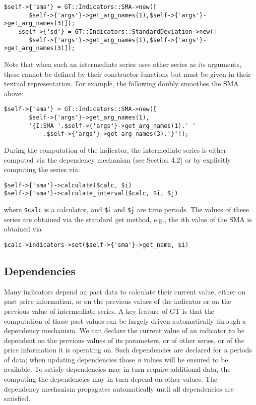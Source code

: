 \documentclass[11pt,twoside]{article}
\begin{document}
\begin{lstlisting}[name=example]
    $self->{'sma'} = GT::Indicators::SMA->new([
       $self->{'args'}->get_arg_names(1),$self->{'args'}->get_arg_names(3)]);
    $self->{'sd'} = GT::Indicators::StandardDeviation->new([
       $self->{'args'}->get_arg_names(1),$self->{'args'}->get_arg_names(3)]);
\end{lstlisting}
Note that when such an intermediate series uses other series as its arguments,
these cannot be defined by their constructor functions but must be given
in their textual representation. For example, the following doubly smoothes
the SMA above:
\begin{lstlisting}[numbers=none]
    $self->{'sma'} = GT::Indicators::SMA->new([
       $self->{'args'}->get_arg_names(1), 
       '{I:SMA '.$self->{'args'}->get_arg_names(1).' '
           .$self->{'args'}->get_arg_names(3).'}']);
\end{lstlisting}


During the computation of the indicator, the intermediate series is
either computed via the dependency mechanism (see Section 4.2) or by
explicitly computing the series via:

\begin{lstlisting}[numbers=none]
$self->{'sma'}->calculate($calc, $i)
$self->{'sma'}->calculate_interval($calc, $i, $j)
\end{lstlisting}
where \lstinline!$calc! is a calculator, and
\lstinline!$i! and \lstinline!$j! are time periods.
The values of these series are obtained via the standard get method,
e.g., the \textit{i}th value of the SMA is obtained via
\begin{lstlisting}[numbers=none]
$calc->indicators->set($self->{'sma'}->get_name, $i)
\end{lstlisting}

\subsection[Dependencies]{\label{bkm:Ref192502803}Dependencies}
Many indicators depend on past data to calculate their current value,
either on past price information, or on the previous values of the
indicator or on the previous value of intermediate series. A key
feature of GT is that the computation of those past values can be
largely driven automatically through a dependency mechanism. We can
declare the current value of an indicator to be dependent on the
previous values of its parameters, or of other series, or of the price
information it is operating on. Such dependencies are declared for
\textit{n} periods of data; when updating dependencies those \textit{n}
values will be ensured to be available. To satisfy dependencies may in
turn require additional data, the computing the dependencies may in
turn depend on other values. The dependency mechanism propagates
automatically until all dependencies are satisfied. 
\end{document}
